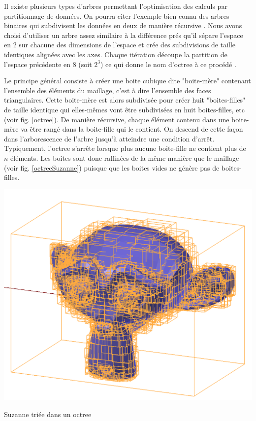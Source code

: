 Il existe plusieurs types d'arbres permettant l'optimisation des calculs par partitionnage de données. On pourra citer l'exemple bien connu des arbres binaires qui subdivisent les données en deux de manière récursive \cite[p. 318–348]{binaire}. Nous avons choisi d'utiliser un arbre assez similaire à la différence prés qu'il sépare l'espace en 2 sur chacune des dimensions de l'espace et crée des subdivisions de taille identiques alignées avec les axes. Chaque itération découpe la partition de l'espace précédente en 8 (soit $2^3$) ce qui donne le nom d'\gls{octree} à ce procédé \cite[p. 5]{octree}. 

Le principe général consiste à créer une boite cubique dite "boite-mère" contenant l'ensemble des éléments du maillage, c'est à dire l'ensemble des faces triangulaires. Cette boite-mère est alors subdivisée pour créer huit "boites-filles" de taille identique qui elles-mêmes vont être subdivisées en huit boites-filles, etc (voir fig. \ref{octree}). De manière récursive, chaque élément contenu dans une boite-mère va être rangé dans la boite-fille qui le contient. On descend de cette façon dans l'arborescence de l'arbre jusqu'à atteindre une condition d'arrêt. Typiquement, l'\gls{octree} s'arrête lorsque plus aucune boite-fille ne contient plus de $n$ éléments. Les boites sont donc raffinées de la même manière que le maillage (voir fig. \ref{octreeSuzanne}) puisque que les boites vides ne génère pas de boites-filles.

\begin{figureth}
	\includegraphics[width=0.6\linewidth]{images/octreeSuzanne}
	\caption{Suzanne triée dans un \gls{octree}}
	\label{octreeSuzanne}
\end{figureth}

